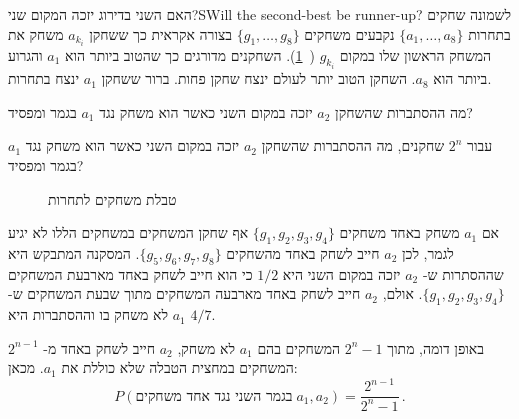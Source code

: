 
\begin{prob}{האם השני בדירוג יזכה המקום שני?}{S}{Will the second-best be runner-up?}
לשמונה שחקים בתחרות 
$\{a_1,\ldots,a_8\}$
נקבעים משחקים 
$\{g_1,\ldots,g_8\}$
בצורה אקראית כך ששחקן
$a_{k_{i}}$
משחק את המשחק הראשון שלו במקום
$g_{k_{i}}$ (~\ref{f.tournament}).
השחקנים מדורגים כך שהטוב ביותר הוא 
$a_1$
והגרוע ביותר הוא 
$a_8$.
השחקן הטוב יותר לעולם ינצח שחקן פחות. ברור ששחקן
$a_1$
ינצח בתחרות.

מה ההסתברות שהשחקן
$a_2$
יזכה במקום השני כאשר הוא משחק נגד 
$a_1$
בגמר ומפסיד?

עבור
$2^n$
שחקנים, מה ההסתברות שהשחקן
$a_2$
יזכה במקום השני כאשר הוא משחק נגד 
$a_1$
בגמר ומפסיד?
\end{prob}
\begin{figure}[tb]
\begin{center}
\end{center}
\caption{טבלת משחקים לתחרות}\label{f.tournament}
\end{figure}

\solution{}

אם 
$a_1$
משחק באחד משחקים
$\{g_1,g_2,g_3,g_4\}$
אף שחקן המשחקים במשחקים הללו לא יגיע לגמר, לכן 
$a_2$
חייב לשחק באחד מהשחקים
$\{g_5,g_6,g_7,g_8\}$.
המסקנה המתבקש היא שההסתרות ש-%
$a_2$
יזכה במקום השני היא
$1/2$
כי הוא חייב לשחק באחד מארבעת המשחקים
$\{g_1,g_2,g_3,g_4\}$.
אולם, 
$a_2$
חייב לשחק באחד מארבעה המשחקים מתוך שבעת המשחקים ש-%
$a_1$
לא משחק בו וההסתברות היא
$4/7$.

באופן דומה, מתוך
$2^n-1$
המשחקים בהם 
$a_1$
לא משחק, 
$a_2$
חייב לשחק באחד מ-%
$2^{n-1}$
המשחקים במחצית הטבלה שלא כוללת את
$a_1$.
מכאן:
\[
P(\textrm{בגמר השני נגד אחד משחקים} \; a_1,a_2)=\frac{2^{n-1}}{2^n-1}\,.
\]

